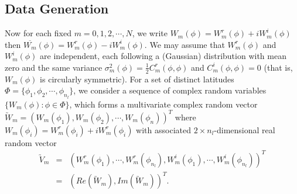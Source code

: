 	
	\subsection{Data Generation}
	
Now for each fixed $m = 0, 1, 2, \cdots, N$, we write  $W_m(\phi) = W_m^r(\phi) + i W_m^i(\phi)$ then $\overline{W_m}(\phi) = W_m^r(\phi) - i W_m^i(\phi)$. We may assume that $W_m^r(\phi)$ and $W_m^i(\phi)$ are independent, each following a (Gaussian) distribution with mean zero and the same variance $\sigma_m^2(\phi) = \frac{1}{2}C_m^r(\phi, \phi)$ and $C_m^i(\phi, \phi) = 0$ (that is, $W_m(\phi)$ is circularly symmetric). For a set of distinct latitudes $\Phi = \{\phi_1, \phi_2, \cdots, \phi_{n_l}\}$, we consider a sequence of complex random variables $\{W_m(\phi): \phi \in \Phi\}$, which forms a multivariate complex random vector $\utilde{W}_m = (W_m(\phi_1), W_m(\phi_2), \cdots, W_m(\phi_n))^T$ where $W_m(\phi_i) = W_m^r(\phi_i) + iW_m^r(\phi_i)$ with associated $2\times n_l$-dimensional real random vector
\begin{eqnarray*}
		\utilde{V}_m  &=& (W_m^r(\phi_1),\cdots,W_m^r(\phi_{n_l}), W_m^i(\phi_1), \cdots, W_m^i(\phi_{n_l}))^T \\
		&=& (Re(\utilde{W}_m), Im(\utilde{W}_m))^T.
	\end{eqnarray*}


